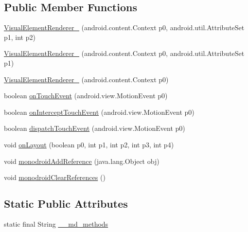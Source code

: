 \subsection*{Public Member Functions}
\begin{CompactItemize}
\item 
\hyperlink{classmd5b60ffeb829f638581ab2bb9b1a7f4f3f_1_1_visual_element_renderer__1_0cda467c85fce2d9022689cb94ec71d6}{VisualElementRenderer\_} (android.content.Context p0, android.util.AttributeSet p1, int p2)
\item 
\hyperlink{classmd5b60ffeb829f638581ab2bb9b1a7f4f3f_1_1_visual_element_renderer__1_cec8fdec15887080a4ca53e275938cc9}{VisualElementRenderer\_} (android.content.Context p0, android.util.AttributeSet p1)
\item 
\hyperlink{classmd5b60ffeb829f638581ab2bb9b1a7f4f3f_1_1_visual_element_renderer__1_ccf7106e42d6c5739ba4e1dec553a0e6}{VisualElementRenderer\_} (android.content.Context p0)
\item 
boolean \hyperlink{classmd5b60ffeb829f638581ab2bb9b1a7f4f3f_1_1_visual_element_renderer__1_3beb6d0ebf9e1eca68fed2eac13c88ac}{onTouchEvent} (android.view.MotionEvent p0)
\item 
boolean \hyperlink{classmd5b60ffeb829f638581ab2bb9b1a7f4f3f_1_1_visual_element_renderer__1_f640d27a1867f3d3c63a835f6fd57ecf}{onInterceptTouchEvent} (android.view.MotionEvent p0)
\item 
boolean \hyperlink{classmd5b60ffeb829f638581ab2bb9b1a7f4f3f_1_1_visual_element_renderer__1_76b5ca405a881f2e09918f282c760285}{dispatchTouchEvent} (android.view.MotionEvent p0)
\item 
void \hyperlink{classmd5b60ffeb829f638581ab2bb9b1a7f4f3f_1_1_visual_element_renderer__1_8c7af843aeec04827cb3a3981ea1978d}{onLayout} (boolean p0, int p1, int p2, int p3, int p4)
\item 
void \hyperlink{classmd5b60ffeb829f638581ab2bb9b1a7f4f3f_1_1_visual_element_renderer__1_321b2967faff34b0f7971f55915f583e}{monodroidAddReference} (java.lang.Object obj)
\item 
void \hyperlink{classmd5b60ffeb829f638581ab2bb9b1a7f4f3f_1_1_visual_element_renderer__1_4a1c180026d8eab71549e47b7de4b9b8}{monodroidClearReferences} ()
\end{CompactItemize}
\subsection*{Static Public Attributes}
\begin{CompactItemize}
\item 
static final String \hyperlink{classmd5b60ffeb829f638581ab2bb9b1a7f4f3f_1_1_visual_element_renderer__1_4ef182bc984a4330ed789e1f0b0222d1}{\_\-\_\-md\_\-methods}
\end{CompactItemize}
